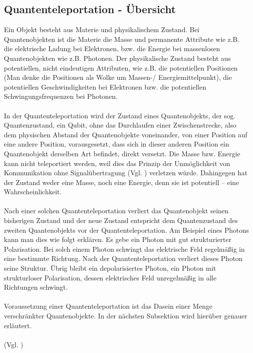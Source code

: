 \subsection{Quantenteleportation - Übersicht}
Ein Objekt besteht aus Materie und physikalischem Zustand. Bei Quantenobjekten ist die Materie die Masse und permanente Attribute wie z.B. die elektrische Ladung bei Elektronen, bzw. die Energie bei massenlosen Quantenobjekten wie z.B. Photonen. Der physikalische Zustand besteht aus potentiellen, nicht eindeutigen Attributen, wie z.B. die potentiellen Positionen (Man denke die Positionen als Wolke um Massen-/ Energiemittelpunkt), die potentiellen Geschwindigkeiten bei Elektronen bzw. die potentiellen Schwingungsfrequenzen bei Photonen.\\
\\
In der Quantenteleportation wird der Zustand eines Quantenobjekts, der sog. Quantenzustand, ein Qubit, ohne das Durchlaufen einer Zwischenstrecke, also dem physischen Abstand der Quantenobjekte voneinander, von einer Position auf eine andere Position, vorausgesetzt, dass sich in dieser anderen Position ein Quantenobjekt derselben Art befindet, direkt versetzt. Die Masse bzw. Energie kann nicht teleportiert werden, weil dies das Prinzip der Unmöglichkeit von Kommunikation ohne Signalübertragung (Vgl. \cite[S.47-49]{gisin_unbegreifliche_2014})  verletzen würde. Dahingegen hat der Zustand weder eine Masse, noch eine Energie, denn sie ist potentiell – eine Wahrscheinlichkeit.\\
\\
Nach einer solchen Quantenteleportation verliert das Quantenobjekt seinen bisherigen Zustand und der neue Zustand entspricht dem Quantenzustand des zweiten Quantenobjekts vor der Quantenteleportation. Am Beispiel eines Photons kann man dies wie folgt erklären. Es gebe ein Photon mit gut strukturierter Polarisation. Bei solch einem Photon schwingt das elektrische Feld regelmäßig in eine bestimmte Richtung. Nach der Quantenteleportation verliert dieses Photon seine Struktur. Übrig bleibt ein depolarisiertes Photon, ein Photon mit strukturloser Polarisation, dessen elektrisches Feld unregelmäßig in alle Richtungen schwingt.\\
\\
Voraussetzung einer Quantenteleportation ist das Dasein einer Menge verschränkter Quantenobjekte. In der nächsten Subsektion wird hierüber genauer erläutert.\\
\\
(Vgl. \cite[S.124-128]{gisin_unbegreifliche_2014}) 


